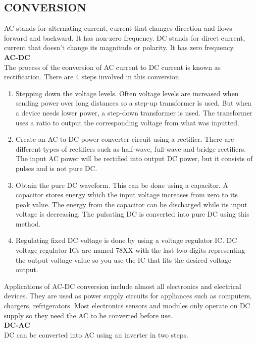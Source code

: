 \documentclass[12pt,a4paper]{article}
\begin{document}
\newpage
			\subsection{CONVERSION}
			AC stands for alternating current, current that changes direction and flows forward and backward. It has non-zero frequency. DC stands for direct current, current that doesn’t change its magnitude or polarity. It has zero frequency.\\
			\textbf{AC-DC}\\
			The process of the conversion of AC current to DC current is known as rectification. There are 4 steps involved in this conversion.\cite{ACDC}\\
			\begin{enumerate}
				\item Stepping down the voltage levels. Often voltage levels are increased when sending power over long distances so a step-up transformer is used. But when a device needs lower power, a step-down transformer is used. The transformer uses a ratio to output the corresponding voltage from what was inputted.
				\item Create an AC to DC power converter circuit using a rectifier. There are different types of rectifiers such as half-wave, full-wave and bridge rectifiers. The input AC power will be rectified into output DC power, but it consists of pulses and is not pure DC.
				\item Obtain the pure DC waveform. This can be done using a capacitor. A capacitor stores energy which the input voltage increases from zero to its peak value. The energy from the capacitor can be discharged while its input voltage is decreasing. The pulsating DC is converted into pure DC using this method.
				\item Regulating fixed DC voltage is done by using a voltage regulator IC. DC voltage regulator ICs are named 78XX with the last two digits representing the output voltage value so you use the IC that fits the desired voltage output.
			\end{enumerate}
			Applications of AC-DC conversion include almost all electronics and electrical devices. They are used as power supply circuits for appliances such as computers, chargers, refrigerators. Most electronics sensors and modules only operate on DC supply so they need the AC to be converted before use.
			\\\textbf{DC-AC}\\
			DC can be converted into AC using an inverter in two steps.\cite{DCAC}
\end{document}
